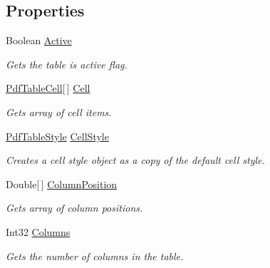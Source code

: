 \subsection*{Properties}
\begin{DoxyCompactItemize}
\item 
Boolean \hyperlink{class_pdf_file_writer_1_1_pdf_table_a18b72b681ae125a8762226c23f43f9ba}{Active}
\begin{DoxyCompactList}\small\item\em Gets the table is active flag. \end{DoxyCompactList}\item 
\hyperlink{class_pdf_file_writer_1_1_pdf_table_cell}{Pdf\+Table\+Cell}\mbox{[}$\,$\mbox{]} \hyperlink{class_pdf_file_writer_1_1_pdf_table_abdd6b3231379da7acad123908813622b}{Cell}
\begin{DoxyCompactList}\small\item\em Gets array of cell items. \end{DoxyCompactList}\item 
\hyperlink{class_pdf_file_writer_1_1_pdf_table_style}{Pdf\+Table\+Style} \hyperlink{class_pdf_file_writer_1_1_pdf_table_a030631b4e73051bcd9c0d07818b1e934}{Cell\+Style}
\begin{DoxyCompactList}\small\item\em Creates a cell style object as a copy of the default cell style. \end{DoxyCompactList}\item 
Double\mbox{[}$\,$\mbox{]} \hyperlink{class_pdf_file_writer_1_1_pdf_table_ae3267d7559402fed44317f653ce1a0a1}{Column\+Position}
\begin{DoxyCompactList}\small\item\em Gets array of column positions. \end{DoxyCompactList}\item 
Int32 \hyperlink{class_pdf_file_writer_1_1_pdf_table_a08f3f6df9d1128ef8dba1bba064c4b32}{Columns}
\begin{DoxyCompactList}\small\item\em Gets the number of columns in the table. \end{DoxyCompactList}\item 

\end{DoxyCompactItemize}
